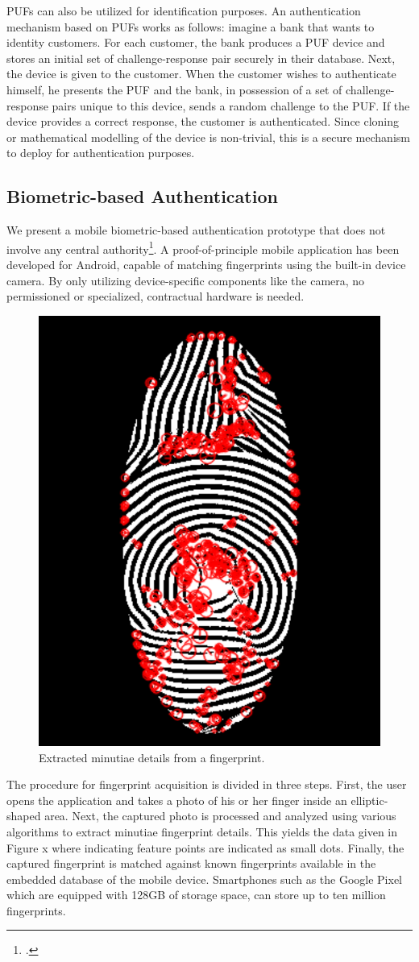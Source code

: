\documentclass[USenglish]{article}
\begin{document}
PUFs can also be utilized for identification purposes.
An authentication mechanism based on PUFs works as follows: imagine a bank that wants to identity customers.
For each customer, the bank produces a PUF device and stores an initial set of challenge-response pair securely in their database.
Next, the device is given to the customer.
When the customer wishes to authenticate himself, he presents the PUF and the bank, in possession of a set of challenge-response pairs unique to this device, sends a random challenge to the PUF.
If the device provides a correct response, the customer is authenticated.
Since cloning or mathematical modelling of the device is non-trivial, this is a secure mechanism to deploy for authentication purposes.

\subsection{Biometric-based Authentication}

We present a mobile biometric-based authentication prototype that does not involve any central authority\footcite{hammudoglu2017portable}.
A proof-of-principle mobile application has been developed for Android, capable of matching fingerprints using the built-in device camera.
By only utilizing device-specific components like the camera, no permissioned or specialized, contractual hardware is needed.

\begin{figure}[t]
	\centering
	\includegraphics[width=.5\columnwidth]{assets/fingerprint}
	\caption{Extracted minutiae details from a fingerprint.}
	\label{fig:fingerprint}
\end{figure}

The procedure for fingerprint acquisition is divided in three steps.
First, the user opens the application and takes a photo of his or her finger inside an elliptic-shaped area.
Next, the captured photo is processed and analyzed using various algorithms to extract minutiae fingerprint details.
This yields the data given in Figure x where indicating feature points are indicated as small dots.
Finally, the captured fingerprint is matched against known fingerprints available in the embedded database of the mobile device.
Smartphones such as the Google Pixel which are equipped with 128GB of storage space, can store up to ten million fingerprints.
\end{document}
